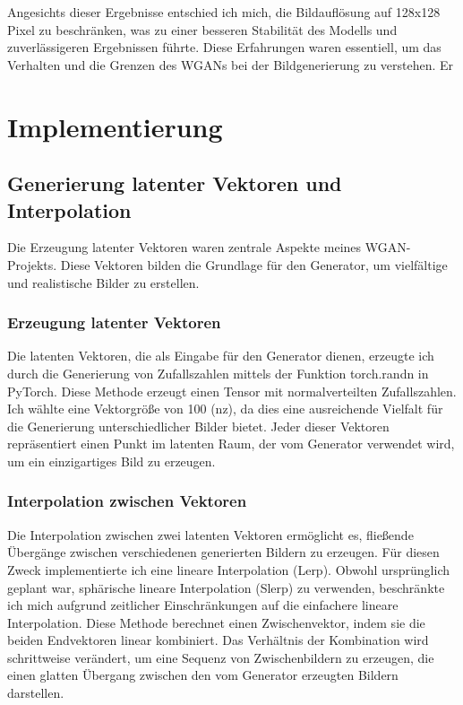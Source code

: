 \documentclass[a4paper, 12pt]{article}
\begin{document}
Angesichts dieser Ergebnisse entschied ich mich, die Bildauflösung auf 128x128 Pixel zu beschränken, was zu einer besseren Stabilität des Modells und zuverlässigeren Ergebnissen führte. Diese Erfahrungen waren essentiell, um das Verhalten und die Grenzen des WGANs bei der Bildgenerierung zu verstehen.
Er

\section{Implementierung}
\subsection{Generierung latenter Vektoren und Interpolation}
Die Erzeugung latenter Vektoren waren zentrale Aspekte meines WGAN-Projekts. Diese Vektoren bilden die Grundlage für den Generator, um vielfältige und realistische Bilder zu erstellen.

\subsubsection{Erzeugung latenter Vektoren}
Die latenten Vektoren, die als Eingabe für den Generator dienen, erzeugte ich durch die Generierung von Zufallszahlen mittels der Funktion torch.randn in PyTorch. Diese Methode erzeugt einen Tensor mit normalverteilten Zufallszahlen. Ich wählte eine Vektorgröße von 100 (nz), da dies eine ausreichende Vielfalt für die Generierung unterschiedlicher Bilder bietet. Jeder dieser Vektoren repräsentiert einen Punkt im latenten Raum, der vom Generator verwendet wird, um ein einzigartiges Bild zu erzeugen.

\subsubsection{Interpolation zwischen Vektoren}
Die Interpolation zwischen zwei latenten Vektoren ermöglicht es, fließende Übergänge zwischen verschiedenen generierten Bildern zu erzeugen. Für diesen Zweck implementierte ich eine lineare Interpolation (Lerp). Obwohl ursprünglich geplant war, sphärische lineare Interpolation (Slerp) zu verwenden, beschränkte ich mich aufgrund zeitlicher Einschränkungen auf die einfachere lineare Interpolation. Diese Methode berechnet einen Zwischenvektor, indem sie die beiden Endvektoren linear kombiniert. Das Verhältnis der Kombination wird schrittweise verändert, um eine Sequenz von Zwischenbildern zu erzeugen, die einen glatten Übergang zwischen den vom Generator erzeugten Bildern darstellen.
\end{document}

